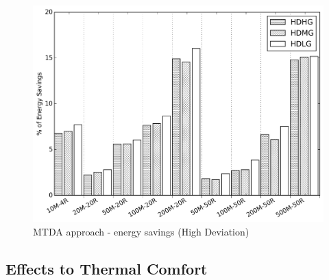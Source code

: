 \begin{figure}
\centering
\includegraphics[width=0.9\linewidth]{figs/perc_energy_diff_temp_flex_def_vs_oarb_high_mtd.png}	
\caption{MTDA approach - energy savings (High Deviation)}
\label{fig:atc_mehr}
\end{figure}


\subsection{Effects to Thermal Comfort} \label{sec:atc_comfort}

